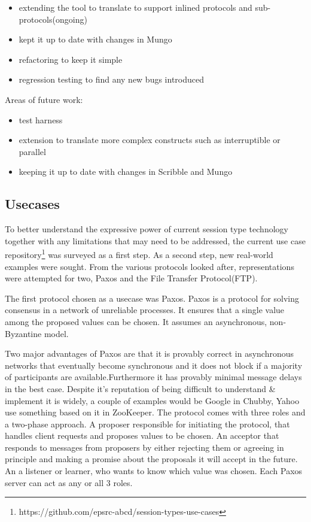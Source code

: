 \begin{itemize}
  \item extending the tool to translate to support inlined protocols and sub-protocols(ongoing)
  \item kept it up to date with changes in Mungo
  \item refactoring to keep it simple
  \item regression testing to find any new bugs introduced
\end{itemize}

Areas of future work:
\begin{itemize}
  \item test harness
  \item extension to translate more complex constructs such as interruptible or parallel
  \item keeping it up to date with changes in Scribble and Mungo
\end{itemize}


\subsection{Usecases}
\label{sub:Usecases}

To better understand the expressive power of current session type technology together with any limitations that may need to be addressed, the current use case repository\footnote{https://github.com/epsrc-abcd/session-types-use-cases} was surveyed as a first step. As a second step, new real-world examples were sought. From the various protocols looked after, representations were attempted for two, Paxos and the File Transfer Protocol(FTP).

The first protocol chosen as a usecase was Paxos. Paxos is a protocol for solving consensus in a network of unreliable processes. It ensures that a single value among the proposed values can be chosen. It assumes an asynchronous, non-Byzantine model.\cite{paxos}

Two major advantages of Paxos are that it is provably correct in asynchronous networks that eventually become synchronous and it does not block if a majority of participants are available.Furthermore it has provably minimal message delays in the best case.
Despite it's reputation of being difficult to understand \& implement it is widely, a couple of examples would be Google in Chubby, Yahoo use something based on it in ZooKeeper.
The protocol comes with three roles and a two-phase approach. A proposer
responsible for initiating the protocol, that handles client requests and
proposes values to be chosen. An acceptor that responds to messages from proposers by either rejecting them or agreeing in principle and making a promise about the proposals it will accept in the future. An a listener or learner, who
wants to know which value was chosen. Each Paxos server can act as any or all 3 roles.

